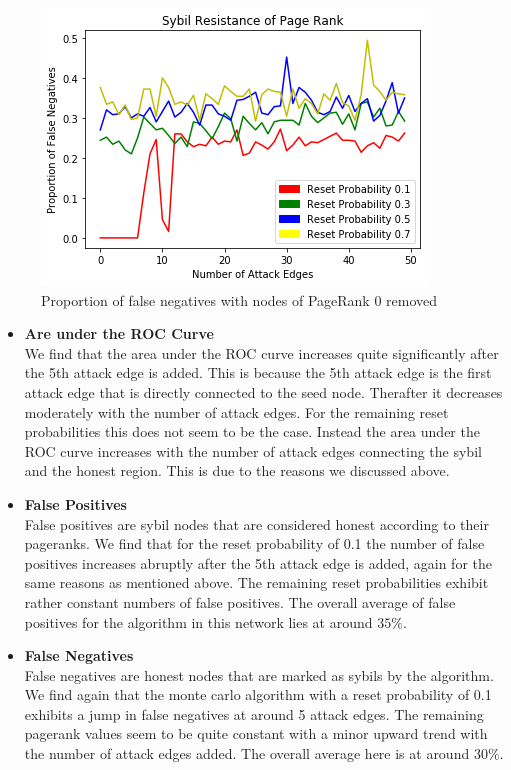\documentclass[sigconf]{acmart}
\theoremstyle{definition}
\begin{document}
\begin{figure}
\includegraphics[scale=0.6]{ROCArea6}
\caption{Proportion of false negatives with nodes of PageRank 0 removed}
\label{fig:ROCArea6}
\end{figure}

\begin{itemize}
\item {\bf Are under the ROC Curve} \\
We find that the area under the ROC curve increases quite significantly after the 5th attack edge is added. This is because the 5th attack edge is the first attack edge that is directly connected to the seed node. Therafter it decreases moderately with the number of attack edges. For the remaining reset probabilities this does not seem to be the case. Instead the area under the ROC curve increases with the number of attack edges connecting the sybil and the honest region. This is due to the reasons we discussed above.

\item {\bf False Positives} \\
False positives are sybil nodes that are considered honest according to their pageranks. We find that for the reset probability of 0.1 the number of false positives increases abruptly after the 5th attack edge is added, again for the same reasons as mentioned above. The remaining reset probabilities exhibit rather constant numbers of false positives. The overall average of false positives for the algorithm in this network lies at around $35\%$.

\item {\bf False Negatives} \\
False negatives are honest nodes that are marked as sybils by the algorithm. We find again that the monte carlo algorithm with a reset probability of 0.1 exhibits a jump in false negatives at around 5 attack edges. The remaining pagerank values seem to be quite constant with a minor upward trend with the number of attack edges added. The overall average here is at around $30\%$.
\end{itemize}
\end{document}
